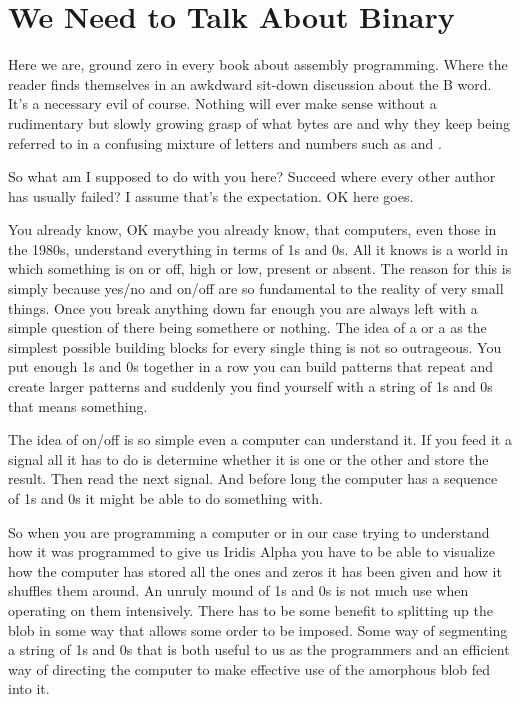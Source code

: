 \chapter{We Need to Talk About Binary} 
\lstset{style=6502Style}

Here we are, ground zero in every book about assembly programming. Where the reader
finds themselves in an awkdward sit-down discussion about the B word. It's a necessary evil
of course. Nothing will ever make sense without a rudimentary but slowly growing
grasp of what bytes are and why they keep being referred to in a confusing mixture
of letters and numbers such as  and .

So what am I supposed to do with you here? Succeed where every other author has
usually failed? I assume that's the expectation. OK here goes.

You already know, OK maybe you already know, that computers, even those in the 
1980s, understand everything in terms of 1s and 0s. All it knows is a world
in which something is on or off, high or low, present or absent. The reason
for this is simply because yes/no and on/off are so fundamental to the reality
of very small things. Once you break anything down far enough you are always
left with a simple question of there being somethere or nothing. The idea of a
 or a  as the simplest possible building blocks for every
single thing is not so outrageous. You put enough 1s and 0s together in a row
you can build patterns that repeat and create larger patterns and suddenly
you find yourself with a string of 1s and 0s that means something.

The idea of on/off is so simple even a computer can understand it. If you feed
it a signal all it has to do is determine whether it is one or the other and
store the result. Then read the next signal. And before long the computer
has a sequence of 1s and 0s it might be able to do something with.

So when you are programming a computer or in our case trying to understand
how it was programmed to give us Iridis Alpha you have to be able to visualize
how the computer has stored all the ones and zeros it has been given and how
it shuffles them around. An unruly mound of 1s and 0s is not much use when
operating on them intensively. There has to be some benefit to splitting
up the blob in some way that allows some order to be imposed. Some way
of segmenting a string of 1s and 0s that is both useful to us as the
programmers and an efficient way of directing the computer to make effective
use of the amorphous blob fed into it.

